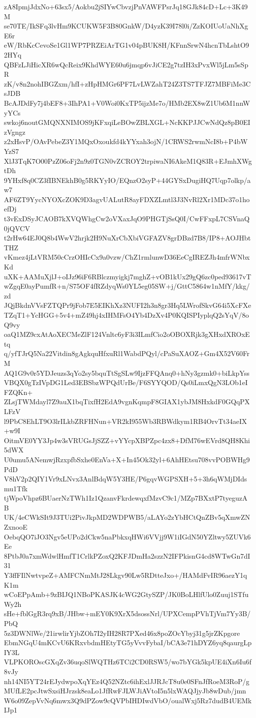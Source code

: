 zA8IpmjJdxNo+63sx5/Aokbu2jSIYwCbvzjPnVAWFPsrJq18GJk84cD+Lc+3K49M
se70TE/IkSFq3lvHm9KCUKW5F3B80GnkW/D4yzK39I78l0i/ZzKOIUoUaNhXgE6r
eW/RbKcCevoSe1Gl1WP7PRZEiArTG1v04pBUK8H/KFnnSrwN4hcnTbLshtO92HYq
QBFzLJiHicXR6wQcReix9KhdWYE60u6jmqp6vJiCE2g7tzIH3xPvxWl5jLm5sSpR
zK/v8n2nohIBGZxm/hfI+zHpHMGr6PF7LvLWZahT24Z3TS7TFJZ7MBFiMe3CsJDB
BcAJDdFy7j4bEF8+3IhPA1+V0Woi0KxTP5ijzMe7o/HMb2EX8wZ1Ub6M1nnWyYCs
swkoj6noutGMQNXNIMOS9jKFxqiLeBOwZBLXGL+NcKKPJJCwNdQz8pB0EIzVgngz
z2xHsvP/OAvPebeZ3Y1MQxOxoukfd4kYYxah3ojN/1CRWS2rwmNcI8b+P4bWYzS7
XlJ3TqK7O00PzZ06oFj2n9z0TGN0vZCROY2trpiwaNI6AkeM1Q83R+EJmhXWgtDh
9YHxf8q0CZ3fIBNEkhB0g5RKYyIO/EQnzO2syP+44GYSxDugiHQ7Uqp7olkp/aw7
AF6ZT9YycNYOXcZOK9D3agvUALutR8ayFDXZLmtl3J3NvRl2Xr1MDc37o1hoefDj
t3vExDSyJCAOB7kXVQWhgCw2oVXaxJqO9PHGTjSsQ0I/CwFFxpL7CSVnaQ0jQVCV
t2rHw64EJ0Q8b4WwV2hrjk2H9NuXrCbXbiVGFAZV8grDBzd7B8/IP8+AOJHbtTHZ
vKmez4jLtVRM50cCrzOHIcCx9a0vzw/ChZ1rmlunwD36EeCgIREZJh4mfrWNbxKd
uXK+AAMuXjlJ+oIJz96iF6RBlczmyigkj7mghZ+vOB1kUx29gQ6zc0ped93617vT
wZgqE0ayPumfR+n/S75OF4fRZdyqWs0YL5eg05SW+j/GttC5864w1nMfY/kkg/zd
JQjBkdnVVsFZTQPr9jFob7E5EIKhXz3NUFI2h3n8gr3Hq5LWrofSkvG64i5XcFXe
TZqT1+YcHGG+5v4+mZ49hj4xIHMFsO4Yb4DzXv4P0KQISPIyplqQ2sYqV/8oQ9vy
oaQ1MZ9cxAtAoXECMeZlF124Vnltc6yF3i3ILmfCio2oOBOXRjk3gXHxdXROxEtq
q/yfTJrQ5Na22Vitdin8gAgkquHfxuRl1WabdPQyl/cPaSuXAOZ+Gm4X52V60FrM
AQ1G9v0r5YDJeuzs3qYo2sy5bquTtSgSLw9IjzFFQAnq0+hNy3gzmk0+biLkpYss
VBQX0gTzIVpDG1Led3EBSbzWPQdUrBe/F6SYYQOD/Qs0iLmxQgN3LOb1eIFZQKn+
ZLsjTWMdayl7Z9auX1bqTixfH2EdA9vgnKqmpF8GIAX1ybJM8HxkdF0GQqPXLFzV
l9PbC8EhLT9O3lrILkbZRFHNun+VR2kI955Wb3RBWdkym1RB4OrvTt34aeIX+w9I
OitmVE0YY3Jp4w3sVRUGsJjSZZ+vYYcpXBPZpc4zx8+DfM76wEVrd8QH8Khi5dWX
U0umu5ANemwjRzxpfbSxhe0EnVa+X+In45Ok32yl+6AhHEtsu708vvPOBWHg9PdD
V8hV2p2QIY1Vr9xLNvx3AnlBdqW5Y3HE/P6gqvWGPSXH+5+3h6qWMjDIdsmu1Tfk
tjWpoVhpz6BUaerNzTWh1Iz1QzanvFkrdewqxfMzvC9c1/MZp7BXxtP7tyeguzAB
UK/4eCWkSIt9J3TUi2PivJkpMD2WDPWB5/aLAYo2zYbHCtQnZBv5qXmwZNZxnooE
OebqQO7iJO3Ngv5eUPo2dCkw5naPbkxqHWi6VVjj9W1iIGdN50YZltwy5ZUVk6Ee
8PtbJ0a7xmWdwlHmfT1CrlkPZoxQ2KFJDmHa2szzN2IFPkisnG4cd8WTwGn7dI31
Y3ffFIlNwtvpeZ+AMFCNmMtJ28Lkgv90Lw5RDtteJxo+/HAMdFvIR96aezY1qK1m
wCoEPpAmb+9zBIJQ1NBoPKASJK4cWG2GtySZP/JK0BoLHlfUlo0Zuuj1STfuWy2h
sHe+fblGgR3rq9xB/JHbw+mEY0K9XrX5dsossNrl/UPXCempPVhTjVm7Yy3B/PbQ
5z3DWNlWe/21irwlirYjbZOh7I2yIH28R7PXed46x8poZOcYbyj31g5jrZKpgore
EbmNGqU4mKCvU6KRxvbdmHEtyTG5yVvvFybaI/bCA3e71hDYZ6yq8qaurgLpIY3L
VLPKOROscGXqZv36uqoSlWQTHz6TCi2CD0RSW5/wo7bYGk5kpUE4iXn6Iu6f8vJy
nh14NI5YT24rEJydwpoXqYEz4Q52NZtc6ihExlJJRJcT8u0e0SFnJfRoeM3RoP/g
MUfLE2pcJtwSxsiHJrzsk8eaLo1JfRwFJLWJiAVtoI5n5lxWAQJjyJb8wDub/jmn
W6o09ZepVvNq6mwx3Q9dPZow9cQVPbIHDIwdVbO/oualWxj5Rz7dudB4UEMkIJp1
